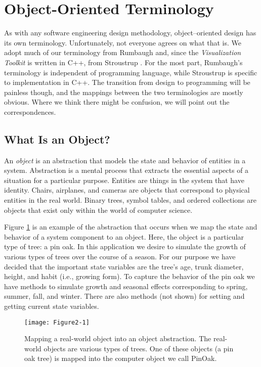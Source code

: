 \section{Object-Oriented Terminology}

As with any software engineering design methodology, object--oriented design has its own terminology. Unfortunately, not everyone agrees on what that is. We adopt much of our terminology from Rumbaugh \cite{Rumbaugh91} and, since the \emph{Visualization Toolkit} is written in C++, from Stroustrup \cite{Stroustrup84}. For the most part, Rumbaugh's terminology is independent of programming language, while Stroustrup is specific to implementation in C++. The transition from design to programming will be painless though, and the mappings between the two terminologies are mostly obvious. Where we think there might be confusion, we will point out the correspondences.

\subsection{What Is an Object?}

An \emph{object} is an abstraction that models the state and behavior of entities in a system. Abstraction is a mental process that extracts the essential aspects of a situation for a particular purpose. Entities are things in the system that have identity. Chairs, airplanes, and cameras are objects that correspond to physical entities in the real world. Binary trees, symbol tables, and ordered collections are objects that exist only within the world of computer science.

Figure \ref{fig:Figure2-1} is an example of the abstraction that occurs when we map the state and behavior of a system component to an object. Here, the object is a particular type of tree: a pin oak. In this application we desire to simulate the growth of various types of trees over the course of a season. For our purpose we have decided that the important state variables are the tree's age, trunk diameter, height, and habit (i.e., growing form). To capture the behavior of the pin oak we have methods to simulate growth and seasonal effects corresponding to spring, summer, fall, and winter. There are also methods (not shown) for setting and getting current state variables.

\begin{figure}[!htb]
	\centering
	\texttt{[image: Figure2-1]}
	\caption{Mapping a real-world object into an object abstraction. The real-world objects are various types of trees. One of these objects (a pin oak tree) is mapped into the computer object we call PinOak.}
	\label{fig:Figure2-1}
\end{figure}


